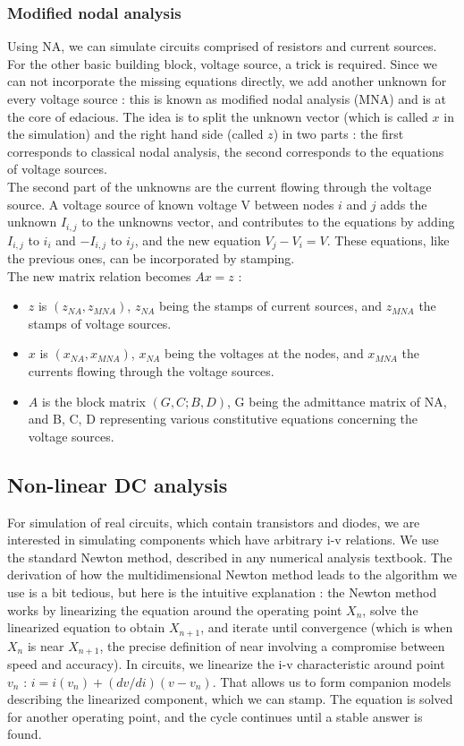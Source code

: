 \documentclass{article}
\begin{document}
\subsubsection{Modified nodal analysis}
Using NA, we can simulate circuits comprised of resistors and current sources. For the other basic building block, voltage source, a trick is required. Since we can not incorporate the missing equations directly, we add another unknown for every voltage source : this is known as modified nodal analysis (MNA) and is at the core of edacious. The idea is to split the unknown vector (which is called $x$ in the simulation) and the right hand side (called $z$) in two parts : the first corresponds to classical nodal analysis, the second corresponds to the equations of voltage sources.\\
The second part of the unknowns are the current flowing through the voltage source. A voltage source of known voltage V between nodes $i$ and $j$ adds the unknown $I_{i,j}$ to the unknowns vector, and contributes to the equations by adding $I_{i,j}$ to $i_i$ and $-I_{i,j}$ to $i_j$, and the new equation $V_j - V_i = V$. These equations, like the previous ones, can be incorporated by stamping.\\
The new matrix relation becomes $Ax = z$ :\\
\begin{itemize}
\item $z$ is $(z_{NA}, z_{MNA})$, $z_{NA}$ being the stamps of current sources, and $z_{MNA}$ the stamps of voltage sources. 
\item $x$ is $(x_{NA}, x_{MNA})$, $x_{NA}$ being the voltages at the nodes, and $x_{MNA}$ the currents flowing through the voltage sources.
\item $A$ is the block matrix $(G,C;B,D)$, G being the admittance matrix of NA, and B, C, D representing various constitutive equations concerning the voltage sources.
\end{itemize}
\subsection{Non-linear DC analysis}
For simulation of real circuits, which contain transistors and diodes, we are interested in simulating components which have arbitrary i-v relations. We use the standard Newton method, described in any numerical analysis textbook. The derivation of how the multidimensional Newton method leads to the algorithm we use is a bit tedious, but here is the intuitive explanation : the Newton method works by linearizing the equation around the operating point $X_n$, solve the linearized equation to obtain $X_{n+1}$, and iterate until convergence (which is when $X_n$ is near $X_{n+1}$, the precise definition of near involving a compromise between speed and accuracy). In circuits, we linearize the i-v characteristic around point $v_n$ : $i = i(v_n) + (dv/di)(v - v_n)$. That allows us to form companion models describing the linearized component, which we can stamp. The equation is solved for another operating point, and the cycle continues until a stable answer is found.
\end{document}
